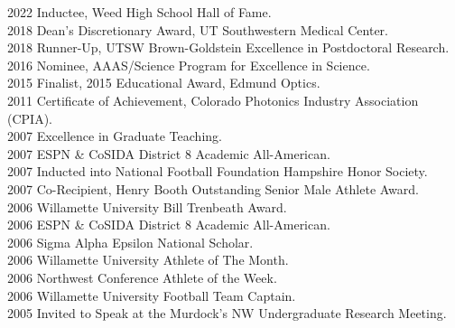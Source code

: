 2022 \hspace{58pt} Inductee, Weed High School Hall of Fame. \\
2018 \hspace{58pt} Dean's Discretionary Award, UT Southwestern Medical Center.  \\
2018 \hspace{58pt} Runner-Up, UTSW Brown-Goldstein Excellence in Postdoctoral Research. \\
2016 \hspace{58pt} Nominee, AAAS/Science Program for Excellence in Science.  \\
2015 \hspace{58pt} Finalist, 2015 Educational Award, Edmund Optics. \\
2011 \hspace{58pt} Certificate of Achievement, Colorado Photonics Industry Association (CPIA). \\
2007 \hspace{58pt} Excellence in Graduate Teaching. \\
2007 \hspace{58pt} ESPN \& CoSIDA District 8 Academic All-American. \\
2007 \hspace{58pt} Inducted into National Football Foundation Hampshire Honor Society.  \\
2007 \hspace{58pt} Co-Recipient, Henry Booth Outstanding Senior Male Athlete Award. \\
2006 \hspace{58pt} Willamette University Bill Trenbeath Award. \\
2006 \hspace{58pt} ESPN \& CoSIDA District 8 Academic All-American. \\
2006 \hspace{58pt} Sigma Alpha Epsilon National Scholar. \\
2006 \hspace{58pt} Willamette University Athlete of The Month.\\
2006 \hspace{58pt} Northwest Conference Athlete of the Week. \\
2006 \hspace{58pt} Willamette University Football Team Captain. \\
2005 \hspace{58pt} Invited to Speak at the Murdock's NW Undergraduate Research Meeting. \\
